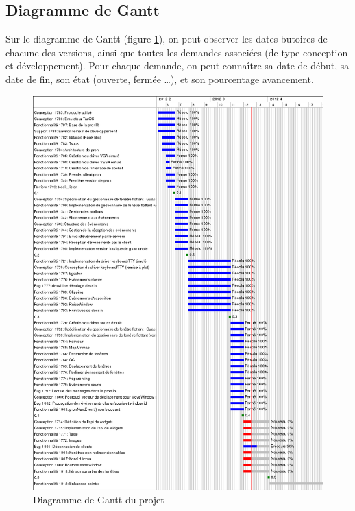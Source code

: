 \subsection{Diagramme de Gantt}
Sur le diagramme de Gantt (figure \ref{fig:diagGant}), on peut observer les dates butoires de chacune des versions, ainsi que toutes les demandes associées (de type conception et développement). Pour chaque demande, on peut connaître sa date de début, sa date de fin, son état (ouverte, fermée \ldots), et son pourcentage avancement.
\begin{figure}[H]
  \centering
    \includegraphics[width=15cm]{figures/tacos-gui-gantt}
  \caption{\label{fig:diagGant}Diagramme de Gantt du projet}
\end{figure}

